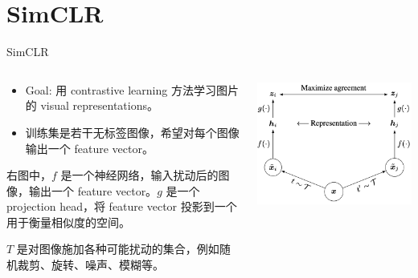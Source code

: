 \section{SimCLR}


\begin{frame}[fragile]{SimCLR}
    \begin{columns}
    \begin{column}{0.7\textwidth}
        \begin{itemize}
            \item Goal: 用 contrastive learning 方法学习图片的 visual representations。
            \item 训练集是若干无标签图像，希望对每个图像输出一个 feature vector。
        \end{itemize}
        右图中，$f$ 是一个神经网络，输入扰动后的图像，输出一个 feature vector。$g$ 是一个 projection head，将 feature vector 投影到一个用于衡量相似度的空间。
        
        $T$ 是对图像施加各种可能扰动的集合，例如随机裁剪、旋转、噪声、模糊等。
    \end{column}
    \begin{column}{0.3\textwidth}
        \begin{center}
            \includegraphics[width=\textwidth]{assets/simclr.png}
        \end{center}
    \end{column}
    \end{columns}
\end{frame}

